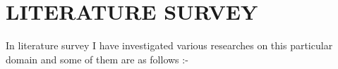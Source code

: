 \chapter{LITERATURE SURVEY}
\label{ch:literature_survey}

In literature survey I have investigated various researches on this particular domain and some of them are as follows :-

